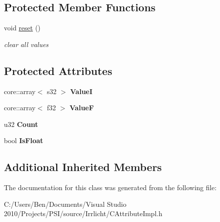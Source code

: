 \subsection*{Protected Member Functions}
\begin{DoxyCompactItemize}
\item 
\hypertarget{classirr_1_1io_1_1_c_numbers_attribute_ab3a71164e162c67af86195b7e7605fc0}{void \hyperlink{classirr_1_1io_1_1_c_numbers_attribute_ab3a71164e162c67af86195b7e7605fc0}{reset} ()}\label{classirr_1_1io_1_1_c_numbers_attribute_ab3a71164e162c67af86195b7e7605fc0}

\begin{DoxyCompactList}\small\item\em clear all values \end{DoxyCompactList}\end{DoxyCompactItemize}
\subsection*{Protected Attributes}
\begin{DoxyCompactItemize}
\item 
\hypertarget{classirr_1_1io_1_1_c_numbers_attribute_a03b0f60708451c4779c88dde3f364a1e}{core\-::array$<$ s32 $>$ {\bfseries Value\-I}}\label{classirr_1_1io_1_1_c_numbers_attribute_a03b0f60708451c4779c88dde3f364a1e}

\item 
\hypertarget{classirr_1_1io_1_1_c_numbers_attribute_a3dd6aeb57049b5ae13c906d2aa010d93}{core\-::array$<$ f32 $>$ {\bfseries Value\-F}}\label{classirr_1_1io_1_1_c_numbers_attribute_a3dd6aeb57049b5ae13c906d2aa010d93}

\item 
\hypertarget{classirr_1_1io_1_1_c_numbers_attribute_a30d727caedd40dbb5d85279af3c35866}{u32 {\bfseries Count}}\label{classirr_1_1io_1_1_c_numbers_attribute_a30d727caedd40dbb5d85279af3c35866}

\item 
\hypertarget{classirr_1_1io_1_1_c_numbers_attribute_a639ae81563120e2e2996a63cb6cc5481}{bool {\bfseries Is\-Float}}\label{classirr_1_1io_1_1_c_numbers_attribute_a639ae81563120e2e2996a63cb6cc5481}

\end{DoxyCompactItemize}
\subsection*{Additional Inherited Members}


The documentation for this class was generated from the following file\-:\begin{DoxyCompactItemize}
\item 
C\-:/\-Users/\-Ben/\-Documents/\-Visual Studio 2010/\-Projects/\-P\-S\-I/source/\-Irrlicht/C\-Attribute\-Impl.\-h\end{DoxyCompactItemize}
